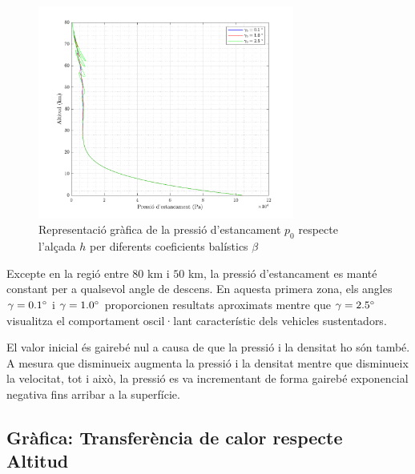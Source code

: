 \begin{figure}[ht]
    \centering
    \includegraphics[width=0.75\textwidth]{imagenes/02_lifting_graficas/pressio_estancament_no_title.pdf}
    \caption{Representació gràfica de la pressió d'estancament $p_0$ respecte l'alçada $h$ per diferents coeficients balístics $\beta$}
    \label{fig:pressio_estancament_lift}
\end{figure}

Excepte en la regió entre $80$ km i $50$ km, la pressió d'estancament es manté constant per a qualsevol angle de descens. En aquesta primera zona, els angles $\gamma = 0.1 \mathrm{^{\circ}}$ i $\gamma = 1.0 \mathrm{^{\circ}}$ proporcionen resultats aproximats mentre que $\gamma = 2.5 \mathrm{^{\circ}}$ visualitza el comportament oscil·lant característic dels vehicles sustentadors. 

El valor inicial és gairebé nul a causa de que la pressió i la densitat ho són també. A mesura que disminueix augmenta la pressió i la densitat mentre que disminueix la velocitat, tot i això, la pressió es va incrementant de forma gairebé exponencial negativa fins arribar a la superfície.


\newpage
\subsection{Gràfica: Transferència de calor respecte Altitud}

